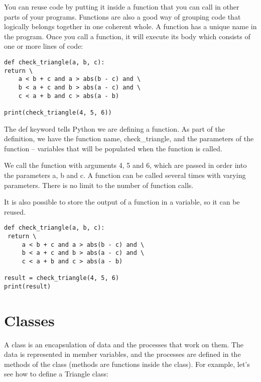 You can reuse code by putting it inside a function that you can call in
other parts of your programs. Functions are also a good way of grouping
code that logically belongs together in one coherent whole. A function
has a unique name in the program. Once you call a function, it will
execute its body which consists of one or more lines of code:

\begin{verbatim}
def check_triangle(a, b, c):
return \
    a < b + c and a > abs(b - c) and \
    b < a + c and b > abs(a - c) and \
    c < a + b and c > abs(a - b)

print(check_triangle(4, 5, 6))
\end{verbatim}

The def keyword tells Python we are defining a function. As part of the
definition, we have the function name, check\_triangle, and the
parameters of the function -- variables that will be populated when the
function is called.

We call the function with arguments 4, 5 and 6, which are passed in
order into the parameters a, b and c. A function can be called several
times with varying parameters. There is no limit to the number of
function calls.

It is also possible to store the output of a function in a variable, so
it can be reused.

\begin{verbatim}
def check_triangle(a, b, c):
 return \
     a < b + c and a > abs(b - c) and \
     b < a + c and b > abs(a - c) and \
     c < a + b and c > abs(a - b)

result = check_triangle(4, 5, 6)
print(result)
\end{verbatim}

\section{Classes}\label{classes}

A class is an encapsulation of data and the processes that work on them.
The data is represented in member variables, and the processes are
defined in the methods of the class (methods are functions inside the
class). For example, let's see how to define a Triangle class:

